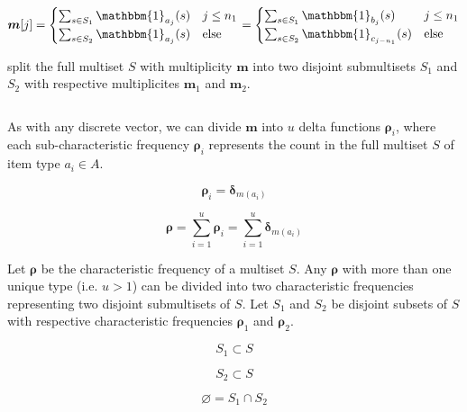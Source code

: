 \documentclass{article}
\begin{document}
\begin{equation}
    \bm{m}[j] = \begin{cases} \sum_{s \in S_1} \mathbbm{1}_{a_j}(s) & j\leq n_1 \\  \sum_{s \in S_2} \mathbbm{1}_{a_j}(s) & \text{else} \end{cases} = \begin{cases} \sum_{s \in S_1} \mathbbm{1}_{b_{j}}(s) & j\leq n_1 \\  \sum_{s \in S_2} \mathbbm{1}_{c_{j - n_1}}(s) & \text{else} \end{cases}
\end{equation}


split the full multiset $S$ with multiplicity $\bm{m}$ into two disjoint submultisets $S_1$ and $S_2$ with respective multiplicites $\bm{m}_1$ and $\bm{m}_2$.

\begin{equation}
    
\end{equation}


As with any discrete vector, we can divide $\bm{m}$ into $u$ delta functions $\bm{\rho}_i$, where each sub-characteristic frequency $\bm{\rho}_i$ represents the count in the full multiset $S$ of item type $a_i \in A$.

\begin{equation}
    \bm{\rho}_i = \bm{\delta}_{m(a_i)}
\end{equation}

\begin{equation}
    \bm{\rho} = \sum_{i = 1}^{u} \bm{\rho}_i = \sum_{i = 1}^{u} \bm{\delta}_{m(a_i)}
\end{equation}



Let $\bm{\rho}$ be the characteristic frequency of a multiset $S$. Any $\bm{\rho}$ with more than one unique type (i.e. $u>1$) can be divided into two characteristic frequencies representing two disjoint submultisets of $S$. Let $S_1$ and $S_2$ be disjoint subsets of $S$ with respective characteristic frequencies $\bm{\rho}_1$ and $\bm{\rho}_2$.

\begin{equation}
    S_1 \subset S
\end{equation}

\begin{equation}
    S_2 \subset S
\end{equation}

\begin{equation}
    \varnothing = S_1 \cap S_2
\end{equation}
\end{document}

